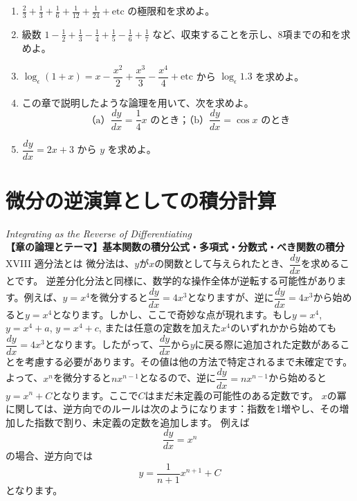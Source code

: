 \documentclass[a4paper,11pt,openany]{ltjsbook}
\begin{document}
\begin{enumerate}
\item[(1)] $\frac{2}{3} + \frac{1}{3} + \frac{1}{6} + \frac{1}{12} + \frac{1}{24} + \text{etc}$ の極限和を求めよ。

\item[(2)] 級数 $1 - \frac{1}{2} + \frac{1}{3} - \frac{1}{4} + \frac{1}{5} - \frac{1}{6} + \frac{1}{7}$ など、収束することを示し、8項までの和を求めよ。

\item[(3)] $\log_\epsilon(1+x) = x - \dfrac{x^2}{2} + \dfrac{x^3}{3} - \dfrac{x^4}{4} + \text{etc}$ から $\log_\epsilon 1.3$ を求めよ。

\item[(4)] この章で説明したような論理を用いて、次を求めよ。
\[
\text{（a）$\frac{dy}{dx} = \frac{1}{4} x$ のとき；（b）$\frac{dy}{dx} = \cos x$ のとき}
\]

\item[(5)] $\dfrac{dy}{dx} = 2x + 3$ から $y$ を求めよ。

\end{enumerate}



\chapter{微分の逆演算としての積分計算}
\noindent\textit{\large Integrating as the Reverse of Differentiating}\\[2mm]
\noindent\textbf{\small 【章の論理とテーマ】基本関数の積分公式・多項式・分数式・べき関数の積分}\\[4mm]
XVIII 適分法とは
微分法は、$y$が$x$の関数として与えられたとき、$\dfrac{dy}{dx}$を求めることです。
逆差分化分法と同様に、数学的な操作全体が逆転する可能性があります。例えば、$y = x^4$を微分すると$\dfrac{dy}{dx} = 4x^3$となりますが、逆に$\dfrac{dy}{dx} = 4x^3$から始めると$y = x^4$となります。しかし、ここで奇妙な点が現れます。もし$y = x^4$, $y = x^4 + a$, $y = x^4 + c$, または任意の定数を加えた$x^4$のいずれかから始めても$\dfrac{dy}{dx} = 4x^3$となります。したがって、$\dfrac{dy}{dx}$から$y$に戻る際に追加された定数があることを考慮する必要があります。その値は他の方法で特定されるまで未確定です。
よって、$x^n$を微分すると$nx^{n-1}$となるので、逆に$\dfrac{dy}{dx} = nx^{n-1}$から始めると$y = x^n + C$となります。ここで$C$はまだ未定義の可能性のある定数です。
$x$の冪に関しては、逆方向でのルールは次のようになります：指数を1増やし、その増加した指数で割り、未定義の定数を追加します。
例えば
\[
\dfrac{dy}{dx} = x^n
\]
の場合、逆方向では
\[
y = \dfrac{1}{n + 1} x^{n+1} + C
\]
となります。
\end{document}
